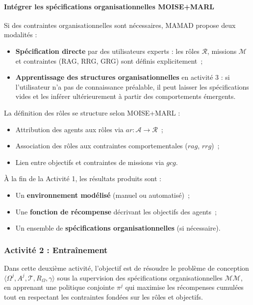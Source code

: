 \paragraph{Intégrer les spécifications organisationnelles MOISE+MARL}

Si des contraintes organisationnelles sont nécessaires, MAMAD propose deux modalités :
\begin{itemize}
    \item \textbf{Spécification directe} par des utilisateurs experts : les rôles $\mathcal{R}$, missions $\mathcal{M}$ et contraintes (RAG, RRG, GRG) sont définis explicitement~;

    \item \textbf{Apprentissage des structures organisationnelles} en activité 3 : si l'utilisateur n'a pas de connaissance préalable, il peut laisser les spécifications vides et les inférer ultérieurement à partir des comportements émergents.
\end{itemize}

La définition des rôles se structure selon MOISE+MARL :
\begin{itemize}
    \item Attribution des agents aux rôles via $ar: \mathcal{A} \to \mathcal{R}$~;
    \item Association des rôles aux contraintes comportementales ($rag$, $rrg$)~;
    \item Lien entre objectifs et contraintes de missions via $gcg$.
\end{itemize}

\vspace{0.4em}
\noindent À la fin de la Activité 1, les résultats produits sont :
\begin{itemize}
    \item Un \textbf{environnement modélisé} (manuel ou automatisé)~;
    \item Une \textbf{fonction de récompense} décrivant les objectifs des agents~;
    \item Un ensemble de \textbf{spécifications organisationnelles} (si nécessaire).
\end{itemize}


\subsubsection{Activité 2 : Entraînement}

Dans cette deuxième activité, l'objectif est de résoudre le problème de conception $\langle \Omega^j, A^j, \mathcal{T}, R_{\Omega}, \gamma \rangle$ sous la supervision des spécifications organisationnelles $\mathcal{MM}$, en apprenant une politique conjointe $\pi^j$ qui maximise les récompenses cumulées tout en respectant les contraintes fondées sur les rôles et objectifs.

